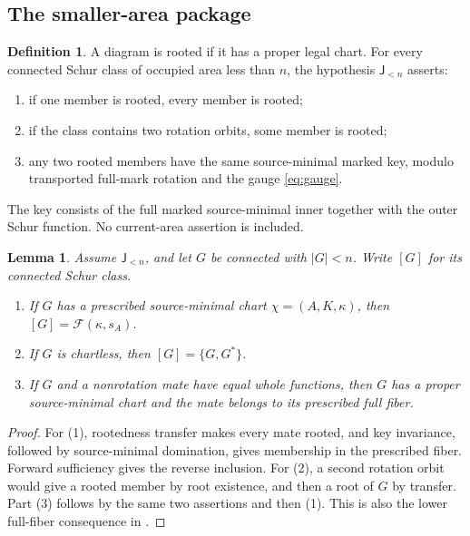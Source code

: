 \documentclass[11pt,a4paper]{amsart}
\numberwithin{equation}{section}
\theoremstyle{plain}
\newtheorem{lemma}[theorem]{Lemma}
\theoremstyle{definition}
\newtheorem{definition}[theorem]{Definition}
\newcommand{\Jlower}{\mathsf J_{<n}}
\begin{document}
\subsection{The smaller-area package}

\begin{definition}\label{def:joint}
A diagram is rooted if it has a proper legal chart.  For every connected Schur class of occupied area less than \(n\), the hypothesis \(\Jlower\) asserts:
\begin{enumerate}
\item if one member is rooted, every member is rooted;
\item if the class contains two rotation orbits, some member is rooted;
\item any two rooted members have the same source-minimal marked key, modulo transported full-mark rotation and the gauge \eqref{eq:gauge}.
\end{enumerate}
The key consists of the full marked source-minimal inner together with the outer Schur function.  No current-area assertion is included.
\end{definition}

\begin{lemma}\label{lem:lower-full}
Assume \(\Jlower\), and let \(G\) be connected with \(|G|<n\).
Write \([G]\) for its connected Schur class.
\begin{enumerate}
\item If \(G\) has a prescribed source-minimal chart \(\chi=(A,K,\kappa)\), then \([G]=\mathcal F(\kappa,s_A)\).
\item If \(G\) is chartless, then \([G]=\{G,G^*\}\).
\item If \(G\) and a nonrotation mate have equal whole functions, then \(G\) has a proper source-minimal chart and the mate belongs to its prescribed full fiber.
\end{enumerate}
\end{lemma}
\begin{proof}
For (1), rootedness transfer makes every mate rooted, and key invariance, followed by source-minimal domination, gives membership in the prescribed fiber.  Forward sufficiency gives the reverse inclusion.  For (2), a second rotation orbit would give a rooted member by root existence, and then a root of \(G\) by transfer.  Part (3) follows by the same two assertions and then (1).  This is also the lower full-fiber consequence in \cite[Smaller-area full-fiber lemma]{Shields2026RibbonPeriod}.
\end{proof}
\end{document}

